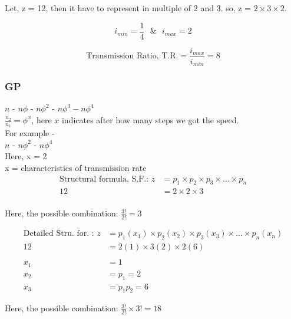 \documentclass{article}
\begin{document}
\begin{multicols*}{2}
  Let, z = 12, then it have to represent in multiple of 2 and 3. so, z = $2 \times 3 \times 2$.

  $$i_{min} = \frac{1}{4} \,\,\,\, \& \,\,\,\, i_{max} = 2$$

  $$\text{Transmission Ratio, T.R.} = \frac{i_{max}}{i_{min}} = 8$$

  \subsubsection*{GP}
  $n$ - $n \phi$ - $n \phi^2$ - $n\phi^3 - n\phi^4$ \\
  $\frac{n_2}{n_1} = \phi^x$, here $x$ indicates after how many steps we got the speed. \\
  For example - \\
  $n$ - $n \phi^2$ - $n\phi^4$ \\ 
  Here, x = 2 \\

  x = characteristics of transmission rate \\

  \begin{align*}
    \text{Structural formula, S.F.: } z &= p_1 \times p_2 \times p_3 \times ... \times p_n \\
    12 &= 2 \times 2 \times 3 \\  
  \end{align*}

  Here, the possible combination: $\frac{3!}{2!} = 3$ 

  \begin{align*}
    \text{Detailed Stru. for. : } z &= p_1 (x_1) \times p_2(x_2) \times p_3 (x_3) \times ... \times p_n (x_n) \\
    12 &= 2(1) \times 3(2) \times 2(6) \\
    &\\
    x_1 &= 1 \\
    x_2 &= p_1 = 2 \\
    x_3 &= p_1p_2 = 6  
  \end{align*}

  Here, the possible combination: $\frac{3!}{2!} \times 3! = 18$ 


\end{multicols*}
\end{document}

